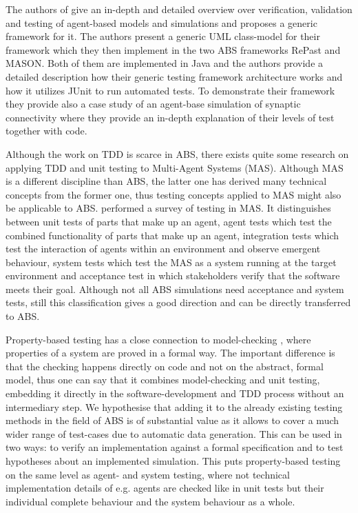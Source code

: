 The authors of \cite{gurcan_generic_2013} give an in-depth and detailed overview over verification, validation and testing of agent-based models and simulations and proposes a generic framework for it. The authors present a generic UML class-model for their framework which they then implement in the two ABS frameworks RePast and MASON. Both of them are implemented in Java and the authors provide a detailed description how their generic testing framework architecture works and how it utilizes JUnit to run automated tests. To demonstrate their framework they provide also a case study of an agent-base simulation of synaptic connectivity where they provide an in-depth explanation of their levels of test together with code.

Although the work on TDD is scarce in ABS, there exists quite some research on applying TDD and unit testing to Multi-Agent Systems (MAS). Although MAS is a different discipline than ABS, the latter one has derived many technical concepts from the former one, thus testing concepts applied to MAS might also be applicable to ABS. \cite{nguyen_testing_2011} performed a survey of testing in MAS. It distinguishes between unit tests of parts that make up an agent, agent tests which test the combined functionality of parts that make up an agent, integration tests which test the interaction of agents within an environment and observe emergent behaviour, system tests which test the MAS as a system running at the target environment and acceptance test in which stakeholders verify that the software meets their goal. Although not all ABS simulations need acceptance and system tests, still this classification gives a good direction and can be directly transferred to ABS.  %

Property-based testing has a close connection to model-checking \cite{mcmillan_symbolic_1993}, where properties of a system are proved in a formal way. The important difference is that the checking happens directly on code and not on the abstract, formal model, thus one can say that it combines model-checking and unit testing, embedding it directly in the software-development and TDD process without an intermediary step. We hypothesise that adding it to the already existing testing methods in the field of ABS is of substantial value as it allows to cover a much wider range of test-cases due to automatic data generation. This can be used in two ways: to verify an implementation against a formal specification and to test hypotheses about an implemented simulation. This puts property-based testing on the same level as agent- and system testing, where not technical implementation details of e.g. agents are checked like in unit tests but their individual complete behaviour and the system behaviour as a whole.

